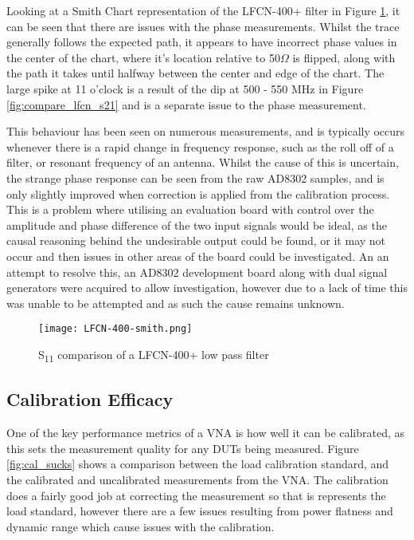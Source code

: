 Looking at a Smith Chart representation of the LFCN-400+ filter in Figure \ref{fig:compare_lfcn_smith}, it can be seen that there are issues with the phase measurements. Whilst the trace generally follows the expected path, it appears to have incorrect phase values in the center of the chart, where it's location relative to 50$\Omega$ is flipped, along with the path it takes until halfway between the center and edge of the chart. The large spike at 11 o'clock is a result of the dip at 500 - 550 MHz in Figure \ref{fig:compare_lfcn_s21} and is a separate issue to the phase measurement. 

This behaviour has been seen on numerous measurements, and is typically occurs whenever there is a rapid change in frequency response, such as the roll off of a filter, or resonant frequency of an antenna. Whilst the cause of this is uncertain, the strange phase response can be seen from the raw AD8302 samples, and is only slightly improved when correction is applied from the calibration process. This is a problem where utilising an evaluation board with control over the amplitude and phase difference of the two input signals would be ideal, as the causal reasoning behind the undesirable output could be found, or it may not occur and then issues in other areas of the board could be investigated. An an attempt to resolve this, an AD8302 development board along with dual signal generators were acquired to allow investigation, however due to a lack of time this was unable to be attempted and as such the cause remains unknown. 

\begin{figure}[H]
	\centering
	\texttt{[image: LFCN-400-smith.png]}
	\caption{S\textsubscript{11} comparison of a LFCN-400+ low pass filter}
	\label{fig:compare_lfcn_smith}
\end{figure}

\subsection{Calibration Efficacy}
One of the key performance metrics of a VNA is how well it can be calibrated, as this sets the measurement quality for any DUTs being measured. Figure \ref{fig:cal_sucks} shows a comparison between the load calibration standard, and the calibrated and uncalibrated measurements from the VNA. The calibration does a fairly good job at correcting the measurement so that is represents the load standard, however there are a few issues resulting from power flatness and dynamic range which cause issues with the calibration. 

